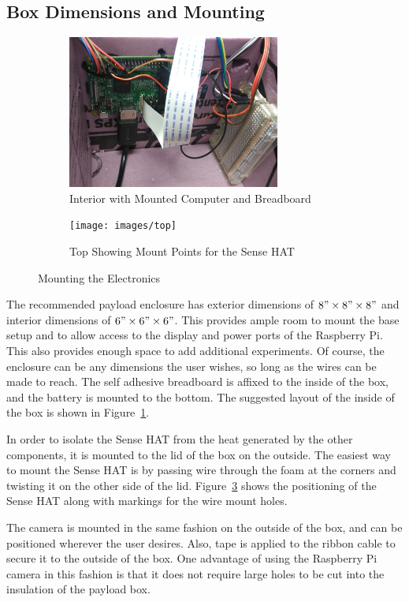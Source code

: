 \documentclass[journal]{new-aiaa}
\begin{document}
\subsection{Box Dimensions and Mounting}
\begin{figure}
    \centering
    \begin{subfigure}{0.45\textwidth}
        \includegraphics[width=2.75in]{images/interior}
        \caption{Interior with Mounted Computer and Breadboard}
        \label{fig:interior}
    \end{subfigure}
    \begin{subfigure}{0.45\textwidth}
        \texttt{[image: images/top]}
        \caption{Top Showing Mount Points for the Sense HAT}
        \label{fig:top}
    \end{subfigure}
    \caption{Mounting the Electronics}
\end{figure}
The recommended payload enclosure has exterior dimensions of
$8"\times8"\times8"$ and interior dimensions of $6"\times6"\times6"$.
This provides ample room to mount the base setup and to allow access to the
display and power ports of the Raspberry Pi.  This also provides
enough space to add additional experiments.  Of course, the
enclosure can be any dimensions the user wishes, so long as the wires
can be made to reach.  The self adhesive breadboard is affixed to the
inside of the box, and the battery is mounted to the bottom.  The
suggested layout of the inside of the box is shown in
Figure~\ref{fig:interior}.

In order to isolate the Sense HAT from the heat generated by the other
components, it is mounted to the lid of the box on the outside.  The
easiest way to mount the Sense HAT is by passing wire through the foam
at the corners and twisting it on the other side of the lid.
Figure~\ref{fig:top} shows the positioning of the Sense HAT along with
markings for the wire mount holes.

The camera is mounted in the same fashion on the outside of the box,
and can be positioned wherever the user desires.  Also, tape is 
applied to the ribbon cable to secure it to the outside of the box.
One advantage of using the Raspberry Pi camera in this fashion is that
it does not require large holes to be cut into the insulation of the
payload box.
\end{document}
